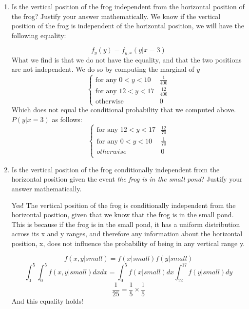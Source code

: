 \documentclass[12pt,twoside]{article}
\begin{document}
\begin{enumerate}
\begin{enumerate}
\item Is the vertical position of the frog independent from the horizontal position of the frog? Justify your answer mathematically. 
\subitem
We know if the vertical position of the frog is independent of the horizontal position, we will have the following equality:

$$
    f_y(y) = f_{y,x}(y|x=3)
$$
What we find is that we do not have the equality, and that the two positions are not independent. We do so by computing the marginal of $y$
$$
    \begin{cases}
    \text{for any } 0 < y < 10 & \frac{1}{400}\\
    \text{for any } 12 < y < 17 & \frac{12}{400}\\
    \text{otherwise } & 0
    \end{cases}
$$
Which does not equal the conditional probability that we computed above. $P(y|x=3)$ as follows:
$$
    \begin{cases}
    \text{for any }  12 < y < 17 & \frac{12}{70} \\
    \text{for any }  0 < y < 10 & \frac{1}{70}\\
    otherwise & 0\\
    \end{cases}
$$
\item Is the vertical position of the frog conditionally independent from the horizontal position given the event \emph{the frog is in the small pond}? Justify your answer mathematically. 

\subitem

Yes! The vertical position of the frog is conditionally independent from the horizontal position, given that we know that the frog is in the small pond. This is because if the frog is in the small pond, it has a uniform distribution across its x and y ranges, and therefore any information about the horizontal position, x, does not influence the probability of being in any vertical range y.

$$
    f(x,y|small) = f(x|small)f(y|small)
$$
$$
    \int_0^5 \int_0^5 f(x,y|small)dxdx = \int_0^5f(x|small)dx \int_{12}^{17}f(y|small)dy
$$
$$
    \frac{1}{25} = \frac{1}{5}\times \frac{1}{5}
$$
And this equality holds!

\end{enumerate}


\end{enumerate}
\end{document}
